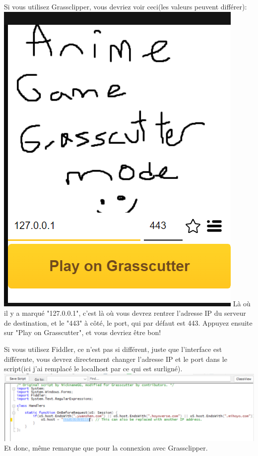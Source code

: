 \documentclass{article}
\begin{document}
Si vous utilisez Grassclipper, vous devriez voir ceci(les valeurs peuvent différer):\newline
\includegraphics[scale=0.8]{img/grassclipper_co.png}\newline
Là où il y a marqué "127.0.0.1", c'est là où vous devrez rentrer l'adresse IP du serveur de destination, et le "443" à côté, le port, qui par défaut est 443.\newline
Appuyez ensuite sur "Play on Grasscutter", et vous devriez être bon!\newline\newline

Si vous utilisez Fiddler, ce n'est pas si différent, juste que l'interface est différente, vous devrez directement changer l'adresse IP et le port dans le script(ici j'ai remplacé le localhost par ce qui est surligné).\newline
\includegraphics[scale=0.6]{img/fiddler_co.png}\newline
Et donc, même remarque que pour la connexion avec Grassclipper.
\end{document}
